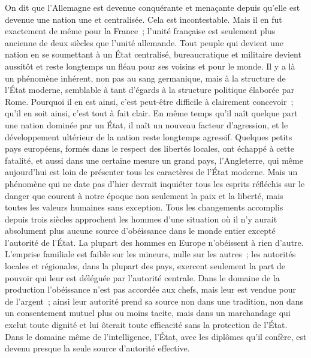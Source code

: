 \documentclass[french,twoside]{book} %
\begin{document}
On dit que l'Allemagne est devenue conquérante et menaçante depuis qu'elle est devenue une nation une et centralisée. Cela est incontestable. Mais il en fut exactement de même pour la France ; l'unité française est seulement plus ancienne de deux siècles que l'unité allemande. Tout peuple qui devient une nation en se soumettant à un État centralisé, bureaucratique et militaire devient aussitôt et reste longtemps un fléau pour ses voisins et pour le monde. Il y a là un phénomène inhérent, non pas au sang germanique, mais à la structure de l'État moderne, semblable à tant d'égards à la structure politique élaborée par Rome. Pourquoi il en est ainsi, c'est peut-être difficile à claire­ment concevoir ; qu'il en soit ainsi, c'est tout à fait clair. En même temps qu'il naît quelque part une nation dominée par un État, il naît un nouveau facteur d'agression, et le développement ultérieur de la nation reste longtemps agres­sif. Quelques petits pays européens, formés dans le respect des libertés locales, ont échappé à cette fatalité, et aussi dans une certaine mesure un grand pays, l'Angleterre, qui même aujourd'hui est loin de présenter tous les caractères de l'État moderne. Mais un phénomène qui ne date pas d'hier devrait inquiéter tous les esprits réfléchis sur le danger que courent à notre époque non seulement la paix et la liberté, mais toutes les valeurs humaines sans exception. Tous les changements accomplis depuis trois siècles appro­chent les hommes d'une situation où il n'y aurait absolument plus aucune source d'obéissance dans le monde entier excepté l'autorité de l'État. La plupart des hommes en Europe n'obéissent à rien d'autre. L'emprise familiale est faible sur les mineurs, nulle sur les autres ; les autorités locales et régionales, dans la plupart des pays, exercent seulement la part de pouvoir qui leur est déléguée par l'autorité centrale. Dans le domaine de la production l'obéissance n'est pas accordée aux chefs, mais leur est vendue pour de l'argent ; ainsi leur autorité prend sa source non dans une tradition, non dans un consentement mutuel plus ou moins tacite, mais dans un marchandage qui exclut toute dignité et lui ôterait toute efficacité sans la protection de l'État. Dans le domaine même de l'intelligence, l'État, avec les diplômes qu'il confère, est devenu presque la seule source d'autorité effective.\par
\end{document}
